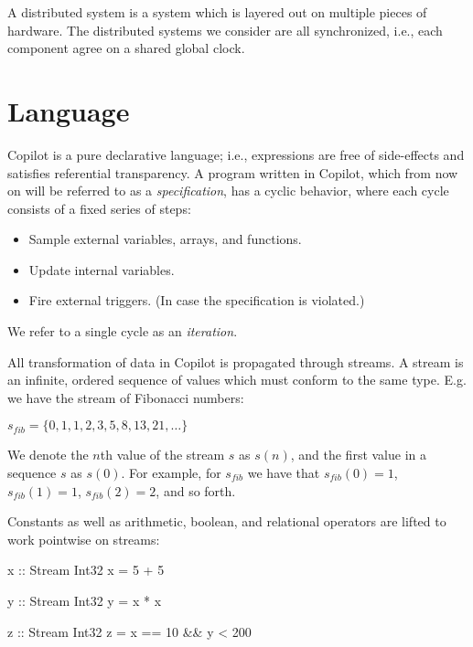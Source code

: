 \documentclass[]{article}
\theoremstyle{example}
\begin{document}
A distributed system is a system which is layered out on multiple pieces of hardware.
The distributed systems we consider are all synchronized, i.e., each component agree on
a shared global clock.

\section{Language}

Copilot is a pure declarative language; i.e., expressions are free of side-effects
and satisfies referential transparency.
A program written in Copilot, which from now on will be referred to as a \emph{specification},
has a cyclic behavior, where each cycle consists of a fixed series of steps:

\begin{itemize}
\item Sample external variables, arrays, and functions.
\item Update internal variables.
\item Fire external triggers. (In case the specification is violated.)
\end{itemize}

\noindent We refer to a single cycle as an \emph{iteration}.

All transformation of data in Copilot is propagated through streams.
A stream is an infinite, ordered sequence of values which must conform to the same type.
E.g. we have the stream of Fibonacci numbers:

\begin{center}
$s_{fib} = \{0, 1, 1, 2, 3, 5, 8, 13, 21, \dots \}$
\end{center}

\noindent We denote the $n$th value of the stream $s$ as $s(n)$, and the first
value in a sequence $s$ as $s(0)$. For example, for $s_{fib}$ we have that $s_{fib}(0) = 1$,
$s_{fib}(1) = 1$, $s_{fib}(2) = 2$, and so forth.

Constants as well as arithmetic, boolean, and relational operators are
lifted to work pointwise on streams:
\\

\noindent
\begin{minipage}{0.3\textwidth}
\begin{code}
x :: Stream Int32
x = 5 + 5
\end{code}
\end{minipage}
\begin{minipage}{0.3\textwidth}
\begin{code}
y :: Stream Int32
y = x * x
\end{code}
\end{minipage}
\begin{minipage}{0.3\textwidth}
\begin{code}
z :: Stream Int32
z = x == 10 && y < 200
\end{code}
\end{minipage}
\\
\end{document}
